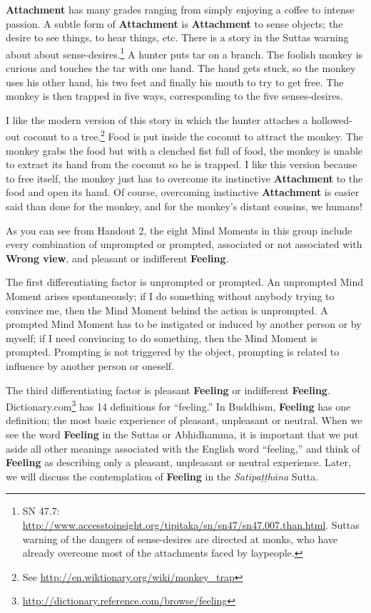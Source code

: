 \textbf{Attachment} has many grades ranging from simply enjoying a coffee to intense passion. A subtle form of \textbf{Attachment} is \textbf{Attachment} to sense objects; the desire to see things, to hear things, etc. There is a story in the Suttas warning about about sense-desires.\footnote{SN 47.7: \url{http://www.accesstoinsight.org/tipitaka/sn/sn47/sn47.007.than.html}. Suttas warning of the dangers of sense-desires are directed at monks, who have already overcome most of the attachments faced by laypeople.} A hunter puts tar on a branch. The foolish monkey is curious and touches the tar with one hand. The hand gets stuck, so the monkey uses his other hand, his two feet and finally his mouth to try to get free. The monkey is then trapped in five ways, corresponding to the five senses-desires. 

I like the modern version of this story in which the hunter attaches a hollowed-out coconut to a tree.\footnote{See \url{http://en.wiktionary.org/wiki/monkey_trap}} Food is put inside the coconut to attract the monkey. The monkey grabs the food but with a clenched fist full of food, the monkey is unable to extract its hand from the coconut so he is trapped. I like this version because to free itself, the monkey just has to overcome its instinctive \textbf{Attachment} to the food and open its hand. Of course, overcoming instinctive \textbf{Attachment} is easier said than done for the monkey, and for the monkey’s distant cousins, we humans!

As you can see from Handout 2, the eight Mind Moments in this group include every combination of unprompted or prompted, associated or not associated with \textbf{Wrong view}, and pleasant or indifferent \textbf{Feeling}.

The first differentiating factor is unprompted or prompted. An unprompted Mind Moment arises spontaneously; if I do something without anybody trying to convince me, then the Mind Moment behind the action is unprompted. A prompted Mind Moment has to be instigated or induced by another person or by myself; if I need convincing to do something, then the Mind Moment is prompted. Prompting is not triggered by the object, prompting is related to influence by another person or oneself.

The third differentiating factor is pleasant \textbf{Feeling} or indifferent \textbf{Feeling}. Dictionary.com\footnote{\url{http://dictionary.reference.com/browse/feeling}} has 14 definitions for “feeling.” In Buddhism, \textbf{Feeling} has one definition; the most basic experience of pleasant, unpleasant or neutral. When we see the word \textbf{Feeling} in the Suttas or Abhidhamma, it is important that we put aside all other meanings associated with the English word “feeling,” and think of \textbf{Feeling} as describing only a pleasant, unpleasant or neutral experience. Later, we will discuss the contemplation of \textbf{Feeling} in the \textit{Satipaṭṭhāna} Sutta.

